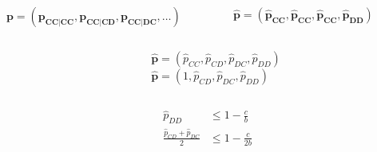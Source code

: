 \documentclass{beamer}
\begin{document}
\begin{frame}
    \begin{center}
        \begin{columns}
            \centering
            \begin{column}{.5\textwidth}
            \centering
        
        \pause 
        \textcolor{blue!40!white}{\small{$\mathbf{p = (p_{CC|CC}, p_{CC|CD}, p_{CC|DC}, \dots)}$}}
            \end{column}
        \pause 
            \begin{column}{.5\textwidth}
                \centering
            
        \pause 
             \textcolor{solarizedGreen}{\small{$\mathbf{\hat{p} = (\hat{p}_{CC}, \hat{p}_{CC}, \hat{p}_{CC}, \hat{p}_{DD})}$}}
                \end{column}
    \end{columns}
    \end{center}
\end{frame}

\begin{frame}
    \begin{center}
        \begin{columns}
            \centering
            \begin{column}{.5\textwidth}
            \centering
        
            \end{column}
        \begin{column}{.6\textwidth}
        \textcolor{solarizedGreen}{\Large{
        $\mathbf{\hat{p}} = (\hat{p}_{CC}, \hat{p}_{CD}, \hat{p}_{DC}, \hat{p}_{DD})$}} \\ \vspace{1cm}
        \pause
        \textcolor{solarizedGreen}{\Large{
        $\mathbf{\hat{p}} = (1, \hat{p}_{CD}, \hat{p}_{DC}, \hat{p}_{DD})$}}
        \end{column}
    \end{columns}
    \end{center}
\end{frame}

\begin{frame}
    \begin{center}
        \Large{
        \textbf{
        \begin{align}
            \hat{p}_{DD} & \leq 1 - \frac{c}{b} \\[2em]
            \frac{\hat{p}_{CD} + \hat{p}_{DC}}{2} & \leq 1 - \frac{c}{2b}
        \end{align}}}
    \end{center}
\end{frame}
\end{document}

